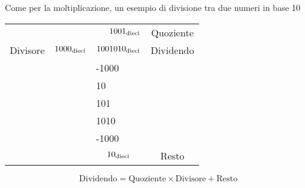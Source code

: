 \documentclass[a4paper,12pt]{article}
\theoremstyle{break}
\numberwithin{equation}{section}
\begin{document}
Come per la moltiplicazione, un esempio di divisione tra due numeri in base 10
\begin{center}
    \begin{tabular}{cccc}
        & & \multicolumn{1}{r}{$1001_{\mbox{\scriptsize dieci}}$} & Quoziente \\
        \hhline{~~-~}
        Divisore & \(1000_{\mbox{\scriptsize dieci}}\) & \multicolumn{1}{|r}{\phantom{-}\(1001010_{\mbox{\scriptsize dieci}}\)} & Dividendo \\
        & & \multicolumn{1}{l}{-1000} & \\
        \hhline{~~-~}
        & & \multicolumn{1}{l}{\phantom{10}10} & \\
        & & \multicolumn{1}{l}{\phantom{10}101} & \\
        & & \multicolumn{1}{l}{\phantom{10}1010} & \\
        & & \multicolumn{1}{l}{\phantom{10}-1000} & \\
        \hhline{~~-~}
        & & \phantom{1000}\(10_{\mbox{\scriptsize dieci}}\) & Resto \\
    \end{tabular}
\end{center}
\[
\mbox{Dividendo} = \mbox{Quoziente} \times \mbox{Divisore} + \mbox{Resto}    
\]
\end{document}
